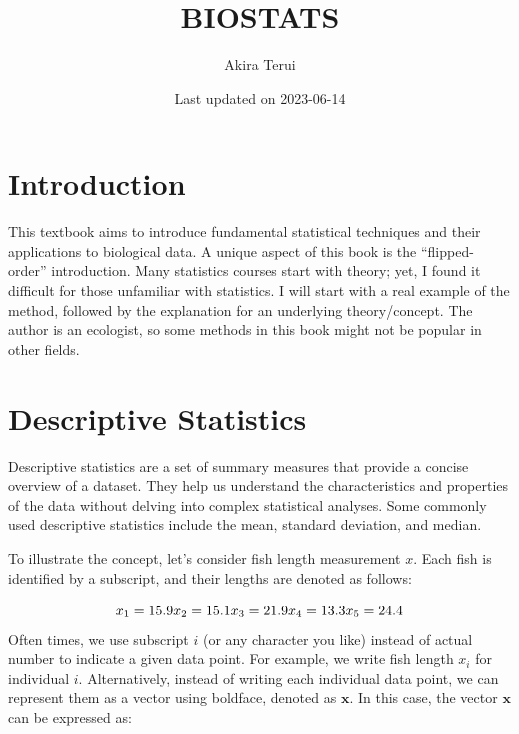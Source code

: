 \documentclass[
]{book}
\title{BIOSTATS}
\author{Akira Terui}
\date{Last updated on 2023-06-14}
\begin{document}
\maketitle

{
\setcounter{tocdepth}{1}
\tableofcontents
}
\hypertarget{introduction}{%
\chapter*{Introduction}\label{introduction}}

This textbook aims to introduce fundamental statistical techniques and their applications to biological data. A unique aspect of this book is the ``flipped-order'' introduction. Many statistics courses start with theory; yet, I found it difficult for those unfamiliar with statistics. I will start with a real example of the method, followed by the explanation for an underlying theory/concept. The author is an ecologist, so some methods in this book might not be popular in other fields.

\hypertarget{descriptive-statistics}{%
\chapter{Descriptive Statistics}\label{descriptive-statistics}}

Descriptive statistics are a set of summary measures that provide a concise overview of a dataset. They help us understand the characteristics and properties of the data without delving into complex statistical analyses. Some commonly used descriptive statistics include the mean, standard deviation, and median.

To illustrate the concept, let's consider fish length measurement \(x\). Each fish is identified by a subscript, and their lengths are denoted as follows:

\[
x_1 = 15.9\\
x_2 = 15.1\\
x_3 = 21.9\\
x_4 = 13.3\\
x_5 = 24.4\\
\]Often times, we use subscript \(i\) (or any character you like) instead of actual number to indicate a given data point. For example, we write fish length \(x_i\) for individual \(i\). Alternatively, instead of writing each individual data point, we can represent them as a vector using boldface, denoted as \(\pmb{x}\). In this case, the vector \(\pmb{x}\) can be expressed as:
\end{document}
